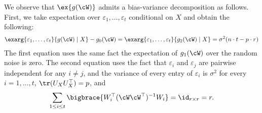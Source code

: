 

	We observe that $\ex{g(\cW)}$ admits a bias-variance decomposition as follows.
	First, we take expectation over $\varepsilon_1, \dots, \varepsilon_t$ conditional on $X$ and obtain the following:
	\begin{align}
		\exarg{\varepsilon_1, \dots, \varepsilon_t}{g(\cW) \mid X} - g_0(\cW)
		= \exarg{\varepsilon_1, \dots, \varepsilon_t}{g_2(\cW) \mid X}
		= \sigma^2(n\cdot t - p\cdot r) \nonumber
	\end{align}
	The first equation uses the same fact the expectation of $g_1(\cW)$ over the random noise is zero.
	The second equation uses the fact that $\varepsilon_i$ and $\varepsilon_j$ are pairwise independent for any $i \neq j$, and the variance of every entry of $\varepsilon_i$ is $\sigma^2$ for every $i = 1,\dots, t$, $\tr(U_X U_X^\top)=p$, and
		\[ \sum_{1\le i\le t} \bigbrace{W_i^{\top} (\cW \cW^{\top})^{-1} W_i}
			= \id_{r\times r} = r. \]

